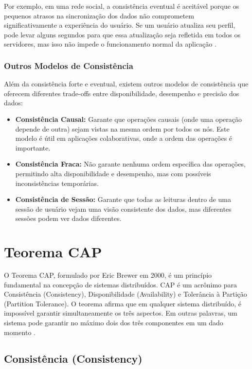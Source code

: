 Por exemplo, em uma rede social, a consistência eventual é aceitável porque os pequenos atrasos na sincronização dos dados não comprometem significativamente a experiência do usuário. Se um usuário atualiza seu perfil, pode levar alguns segundos para que essa atualização seja refletida em todos os servidores, mas isso não impede o funcionamento normal da aplicação \cite{vogels2009}.

\subsubsection{Outros Modelos de Consistência}

Além da consistência forte e eventual, existem outros modelos de consistência que oferecem diferentes trade-offs entre disponibilidade, desempenho e precisão dos dados:

\begin{itemize}
    \item \textbf{Consistência Causal:} Garante que operações causais (onde uma operação depende de outra) sejam vistas na mesma ordem por todos os nós. Este modelo é útil em aplicações colaborativas, onde a ordem das operações é importante.
    \item \textbf{Consistência Fraca:} Não garante nenhuma ordem específica das operações, permitindo alta disponibilidade e desempenho, mas com possíveis inconsistências temporárias.
    \item \textbf{Consistência de Sessão:} Garante que todas as leituras dentro de uma sessão de usuário vejam uma visão consistente dos dados, mas diferentes sessões podem ver dados diferentes.
\end{itemize}

\section{Teorema CAP}

O Teorema CAP, formulado por Eric Brewer em 2000, é um princípio fundamental na concepção de sistemas distribuídos. CAP é um acrônimo para Consistência (Consistency), Disponibilidade (Availability) e Tolerância à Partição (Partition Tolerance). O teorema afirma que em qualquer sistema distribuído, é impossível garantir simultaneamente os três aspectos. Em outras palavras, um sistema pode garantir no máximo dois dos três componentes em um dado momento \cite{brewer2000}.

\subsection{Consistência (Consistency)}

